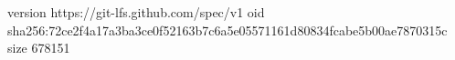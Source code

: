 version https://git-lfs.github.com/spec/v1
oid sha256:72ce2f4a17a3ba3ce0f52163b7c6a5e05571161d80834fcabe5b00ae7870315c
size 678151
